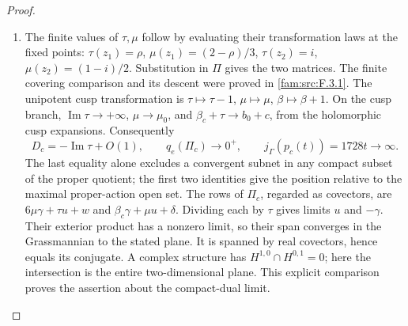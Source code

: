 \begin{proof}
\begin{enumerate}[label=\arabic*.,leftmargin=*]
\item The finite values of $\tau,\mu$ follow by evaluating their transformation
laws at the fixed points: $\tau(z_1)=\rho$,
$\mu(z_1)=(2-\rho)/3$, $\tau(z_2)=i$,
$\mu(z_2)=(1-i)/2$.  Substitution in $\Pi$ gives the two matrices.
The finite covering comparison and its descent were proved in \ref{fam:src:F.3.1}.
The unipotent cusp transformation is
$\tau\mapsto\tau-1$, $\mu\mapsto\mu$, $\beta\mapsto\beta+1$.
On the cusp branch, $\operatorname{Im}\tau\to+\infty$,
$\mu\to\mu_0$, and $\beta_c+\tau\to b_0+c$, from the holomorphic
cusp expansions.  Consequently
\[
 D_c=-\operatorname{Im}\tau+O(1),\qquad
 q_e(\Pi_c)\longrightarrow0^+,
 \qquad j_\Gamma(p_c(t))=1728t\longrightarrow\infty.
\]
The last equality alone excludes a convergent subnet in any compact
subset of the proper quotient; the first two identities give the
position relative to the maximal proper-action open set.
The rows of $\Pi_c$, regarded as covectors, are
$6\mu\gamma+\tau u+w$ and $\beta_c\gamma+\mu u+\delta$.
Dividing each by $\tau$ gives limits $u$ and $-\gamma$.
Their exterior product has a nonzero limit, so their span converges
in the Grassmannian to the stated plane.  It is spanned by real
covectors, hence equals its conjugate.  A complex structure has
$H^{1,0}\cap H^{0,1}=0$; here the intersection is the entire
two-dimensional plane.  This explicit comparison proves the assertion
about the compact-dual limit.
\end{enumerate}
\end{proof}

